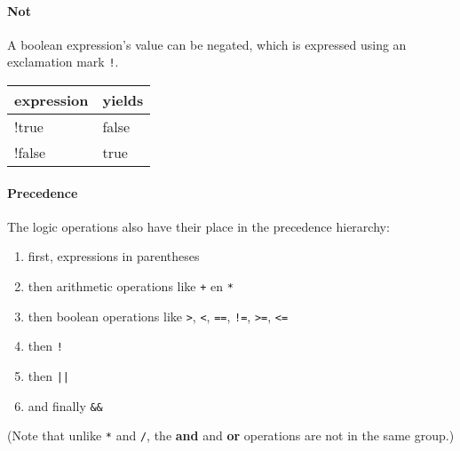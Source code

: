 \paragraph{Not}

A boolean expression's value can be negated, which is expressed using an exclamation mark \texttt{!}.

\begin{center}
  \ttfamily
  \begin{tabular}{l@{\qquad}l}
    {\normalfont expression} & {\normalfont yields} \\
    \midrule
    !true   & false \\
    !false  & true \\
    \midrule
  \end{tabular}
\end{center}

\paragraph{Precedence}

The logic operations also have their place in the precedence hierarchy:

\begin{enumerate}
  \item first, expressions in parentheses
  \item then arithmetic operations like \texttt{+} en \texttt{*}
  \item then boolean operations like \texttt{>}, \texttt{<}, \texttt{==}, \texttt{!=}, \texttt{>=}, \texttt{<=}
  \item then \texttt{!}
  \item then \texttt{||}
  \item and finally \texttt{\&\&}
\end{enumerate}

(Note that unlike \texttt{*} and \texttt{/}, the \textbf{and} and \textbf{or} operations are not in the same group.)

